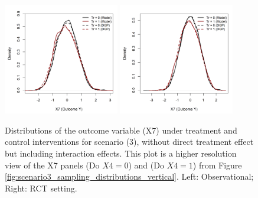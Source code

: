 \begin{figure}[htbp]
\centering
\includegraphics[width=0.45\textwidth]{img/results/observ_scenario3_X7_treatment_densities.png}
\includegraphics[width=0.45\textwidth]{img/results/rct_scenario3_X7_treatment_densities.png}
\caption{Distributions of the outcome variable (X7) under treatment and control interventions for scenario (3), without direct treatment effect but including interaction effects. This plot is a higher resolution view of the X7 panels (Do $X4=0$) and (Do $X4=1$) from Figure \ref{fig:scenario3_sampling_distributions_vertical}. Left: Observational; Right: RCT setting.}
\label{fig:scenario3_outcome_distributions}
\end{figure}




